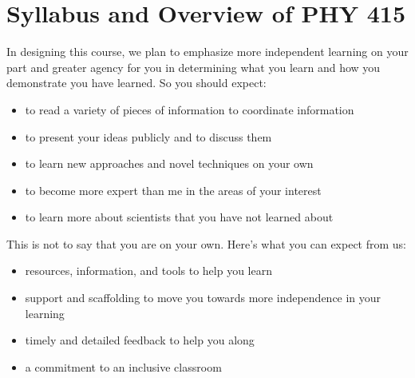 \documentclass[letterpaper,10pt,english]{jupyterBook}
\begin{document}
\sphinxstepscope


\chapter{Syllabus and Overview of PHY 415}
\label{\detokenize{content/0_course/0_syllabus:syllabus-and-overview-of-phy-415}}\label{\detokenize{content/0_course/0_syllabus::doc}}
\sphinxAtStartPar
In designing this course, we plan to emphasize more independent learning on your part and greater agency for you in determining what you learn and how you demonstrate you have learned. So you should expect:
\begin{itemize}
\item {} 
\sphinxAtStartPar
to read a variety of pieces of information to coordinate information

\item {} 
\sphinxAtStartPar
to present your ideas publicly and to discuss them

\item {} 
\sphinxAtStartPar
to learn new approaches and novel techniques on your own

\item {} 
\sphinxAtStartPar
to become more expert than me in the areas of your interest

\item {} 
\sphinxAtStartPar
to learn more about scientists that you have not learned about

\end{itemize}

\sphinxAtStartPar
This is not to say that you are on your own. Here’s what you can expect from us:
\begin{itemize}
\item {} 
\sphinxAtStartPar
resources, information, and tools to help you learn

\item {} 
\sphinxAtStartPar
support and scaffolding to move you towards more independence in your learning

\item {} 
\sphinxAtStartPar
timely and detailed feedback to help you along

\item {} 
\sphinxAtStartPar
a commitment to an inclusive classroom

\end{itemize}

\sphinxAtStartPar
{}
\end{document}
